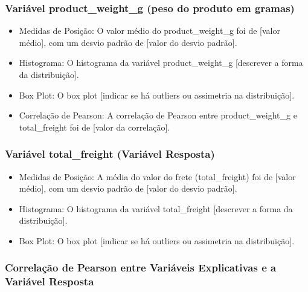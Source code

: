 \documentclass[
]{article}
\begin{document}
\hypertarget{variuxe1vel-product_weight_g-peso-do-produto-em-gramas}{%
\subsubsection{Variável product\_weight\_g (peso do produto em
gramas)}\label{variuxe1vel-product_weight_g-peso-do-produto-em-gramas}}

\begin{itemize}
\item
  Medidas de Posição: O valor médio do product\_weight\_g foi de
  {[}valor médio{]}, com um desvio padrão de {[}valor do desvio
  padrão{]}.
\item
  Histograma: O histograma da variável product\_weight\_g {[}descrever a
  forma da distribuição{]}.
\item
  Box Plot: O box plot {[}indicar se há outliers ou assimetria na
  distribuição{]}.
\item
  Correlação de Pearson: A correlação de Pearson entre
  product\_weight\_g e total\_freight foi de {[}valor da correlação{]}.
\end{itemize}

\hypertarget{variuxe1vel-total_freight-variuxe1vel-resposta}{%
\subsubsection{Variável total\_freight (Variável
Resposta)}\label{variuxe1vel-total_freight-variuxe1vel-resposta}}

\begin{itemize}
\item
  Medidas de Posição: A média do valor do frete (total\_freight) foi de
  {[}valor médio{]}, com um desvio padrão de {[}valor do desvio
  padrão{]}.
\item
  Histograma: O histograma da variável total\_freight {[}descrever a
  forma da distribuição{]}.
\item
  Box Plot: O box plot {[}indicar se há outliers ou assimetria na
  distribuição{]}.
\end{itemize}

\hypertarget{correlauxe7uxe3o-de-pearson-entre-variuxe1veis-explicativas-e-a-variuxe1vel-resposta}{%
\subsubsection{Correlação de Pearson entre Variáveis Explicativas e a
Variável
Resposta}\label{correlauxe7uxe3o-de-pearson-entre-variuxe1veis-explicativas-e-a-variuxe1vel-resposta}}
\end{document}
